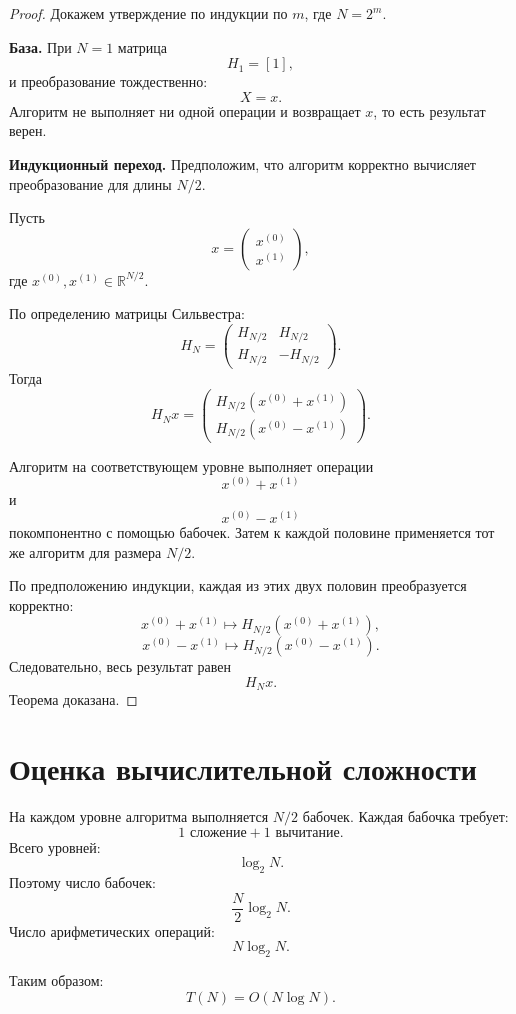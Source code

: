 \documentclass[12pt,a4paper]{article}
\begin{document}
\begin{proof}
Докажем утверждение по индукции по $m$, где $N=2^m$.

\textbf{База.} При $N=1$ матрица
\[
    H_1=[1],
\]
и преобразование тождественно:
\[
    X=x.
\]
Алгоритм не выполняет ни одной операции и возвращает $x$, то есть результат верен.

\textbf{Индукционный переход.} Предположим, что алгоритм корректно вычисляет преобразование для длины $N/2$.

Пусть
\[
    x=
    \begin{pmatrix}
        x^{(0)}\\
        x^{(1)}
    \end{pmatrix},
\]
где $x^{(0)},x^{(1)}\in\mathbb{R}^{N/2}$.

По определению матрицы Сильвестра:
\[
    H_N=
    \begin{pmatrix}
        H_{N/2}&H_{N/2}\\
        H_{N/2}&-H_{N/2}
    \end{pmatrix}.
\]
Тогда
\[
H_Nx
=
\begin{pmatrix}
H_{N/2}(x^{(0)}+x^{(1)})\\
H_{N/2}(x^{(0)}-x^{(1)})
\end{pmatrix}.
\]

Алгоритм на соответствующем уровне выполняет операции
\[
    x^{(0)}+x^{(1)}
\]
и
\[
    x^{(0)}-x^{(1)}
\]
покомпонентно с помощью бабочек. Затем к каждой половине применяется тот же алгоритм для размера $N/2$.

По предположению индукции, каждая из этих двух половин преобразуется корректно:
\[
    x^{(0)}+x^{(1)}
    \mapsto
    H_{N/2}(x^{(0)}+x^{(1)}),
\]
\[
    x^{(0)}-x^{(1)}
    \mapsto
    H_{N/2}(x^{(0)}-x^{(1)}).
\]
Следовательно, весь результат равен
\[
    H_Nx.
\]
Теорема доказана.
\end{proof}

\section{Оценка вычислительной сложности}

На каждом уровне алгоритма выполняется $N/2$ бабочек. Каждая бабочка требует:
\[
    1 \text{ сложение} + 1 \text{ вычитание}.
\]
Всего уровней:
\[
    \log_2 N.
\]
Поэтому число бабочек:
\[
    \frac{N}{2}\log_2 N.
\]
Число арифметических операций:
\[
    N\log_2 N.
\]

Таким образом:
\[
    T(N)=O(N\log N).
\]
\end{document}
